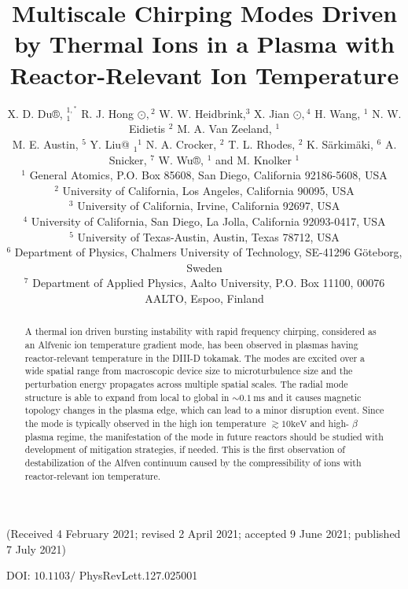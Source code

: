 \documentclass[10pt]{article}
\title{Multiscale Chirping Modes Driven by Thermal Ions in a Plasma with Reactor-Relevant Ion Temperature }
\author{X. D. Du®, ${ }_{1}^{1,{ }^{*}}$ R. J. Hong $\odot,{ }^{2}$ W. W. Heidbrink,${ }^{3}$ X. Jian $\odot,{ }^{4}$ H. Wang, ${ }^{1}$ N. W. Eidietis ${ }^{2}$ M. A. Van Zeeland, ${ }^{1}$\\
M. E. Austin, ${ }^{5}$ Y. Liu@ ${ }_{1}{ }^{1}$ N. A. Crocker, ${ }^{2}$ T. L. Rhodes, ${ }^{2}$ K. Särkimäki, ${ }^{6}$ A. Snicker, ${ }^{7}$ W. Wu®, ${ }^{1}$ and M. Knolker ${ }^{1}$\\
${ }^{1}$ General Atomics, P.O. Box 85608, San Diego, California 92186-5608, USA\\
${ }^{2}$ University of California, Los Angeles, California 90095, USA\\
${ }^{3}$ University of California, Irvine, California 92697, USA\\
${ }^{4}$ University of California, San Diego, La Jolla, California 92093-0417, USA\\
${ }^{5}$ University of Texas-Austin, Austin, Texas 78712, USA\\
${ }^{6}$ Department of Physics, Chalmers University of Technology, SE-41296 Göteborg, Sweden\\
${ }^{7}$ Department of Applied Physics, Aalto University, P.O. Box 11100, 00076 AALTO, Espoo, Finland}
\date{}
\begin{document}
\maketitle
(Received 4 February 2021; revised 2 April 2021; accepted 9 June 2021; published 7 July 2021)

\begin{abstract}
A thermal ion driven bursting instability with rapid frequency chirping, considered as an Alfvenic ion temperature gradient mode, has been observed in plasmas having reactor-relevant temperature in the DIII-D tokamak. The modes are excited over a wide spatial range from macroscopic device size to microturbulence size and the perturbation energy propagates across multiple spatial scales. The radial mode structure is able to expand from local to global in $\sim 0.1 \mathrm{~ms}$ and it causes magnetic topology changes in the plasma edge, which can lead to a minor disruption event. Since the mode is typically observed in the high ion temperature $\gtrsim 10 \mathrm{keV}$ and high- $\beta$ plasma regime, the manifestation of the mode in future reactors should be studied with development of mitigation strategies, if needed. This is the first observation of destabilization of the Alfven continuum caused by the compressibility of ions with reactor-relevant ion temperature.
\end{abstract}

DOI: $10.1103 /$ PhysRevLett.127.025001
\end{document}
